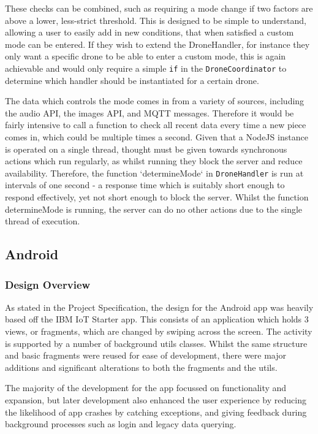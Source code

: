 \documentclass{article}
\begin{document}
These checks can be combined, such as requiring a mode change if two factors are above a lower, less-strict threshold. This is designed to be simple to understand, allowing a user to easily add in new conditions, that when satisfied a custom mode can be entered. If they wish to extend the DroneHandler, for instance they only want a specific drone to be able to enter a custom mode, this is again achievable and would only require a simple \texttt{if} in the \texttt{DroneCoordinator} to determine which handler should be instantiated for a certain drone.

The data which controls the mode comes in from a variety of sources, including the audio API, the images API, and MQTT messages. Therefore it would be fairly intensive to call a function to check all recent data every time a new piece comes in, which could be multiple times a second. Given that a NodeJS instance is operated on a single thread, thought must be given towards synchronous actions which run regularly, as whilst running they block the server and reduce availability. Therefore, the function `determineMode` in \texttt{DroneHandler} is run at intervals of one second - a response time which is suitably short enough to respond effectively, yet not short enough to block the server. Whilst the function determineMode is running, the server can do no other actions due to the single thread of execution.


\subsection{Android}
\subsubsection{Design Overview}
As stated in the Project Specification, the design for the Android app was heavily based off the IBM IoT Starter app\cite{iotStarterAndroid}. This consists of an application which holds 3 views, or fragments, which are changed by swiping across the screen. The activity is supported by a number of background utils classes. Whilst the same structure and basic fragments were reused for ease of development, there were major additions and significant alterations to both the fragments and the utils. 

The majority of the development for the app focussed on functionality and expansion, but later development also enhanced the user experience by reducing the likelihood of app crashes by catching exceptions, and giving feedback during background processes such as login and legacy data querying. 
\end{document}
